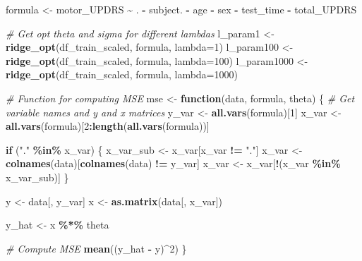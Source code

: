 \documentclass[
]{article}
\newenvironment{Shaded}{\begin{snugshade}}{\end{snugshade}}
\newcommand{\AttributeTok}[1]{\textcolor[rgb]{0.13,0.29,0.53}{#1}}
\newcommand{\CommentTok}[1]{\textcolor[rgb]{0.56,0.35,0.01}{\textit{#1}}}
\newcommand{\ControlFlowTok}[1]{\textcolor[rgb]{0.13,0.29,0.53}{\textbf{#1}}}
\newcommand{\DecValTok}[1]{\textcolor[rgb]{0.00,0.00,0.81}{#1}}
\newcommand{\FunctionTok}[1]{\textcolor[rgb]{0.13,0.29,0.53}{\textbf{#1}}}
\newcommand{\NormalTok}[1]{#1}
\newcommand{\OtherTok}[1]{\textcolor[rgb]{0.56,0.35,0.01}{#1}}
\newcommand{\SpecialCharTok}[1]{\textcolor[rgb]{0.81,0.36,0.00}{\textbf{#1}}}
\newcommand{\StringTok}[1]{\textcolor[rgb]{0.31,0.60,0.02}{#1}}
\begin{document}
\begin{Shaded}
\begin{Highlighting}[]
\NormalTok{formula }\OtherTok{\textless{}{-}}\NormalTok{ motor\_UPDRS }\SpecialCharTok{\textasciitilde{}}\NormalTok{ . }\SpecialCharTok{{-}}\NormalTok{ subject. }\SpecialCharTok{{-}}\NormalTok{ age }\SpecialCharTok{{-}}\NormalTok{ sex }\SpecialCharTok{{-}}\NormalTok{ test\_time }\SpecialCharTok{{-}}\NormalTok{ total\_UPDRS}

\CommentTok{\# Get opt theta and sigma for different lambdas}
\NormalTok{l\_param1 }\OtherTok{\textless{}{-}} \FunctionTok{ridge\_opt}\NormalTok{(df\_train\_scaled, formula, }\AttributeTok{lambda=}\DecValTok{1}\NormalTok{)}
\NormalTok{l\_param100 }\OtherTok{\textless{}{-}} \FunctionTok{ridge\_opt}\NormalTok{(df\_train\_scaled, formula, }\AttributeTok{lambda=}\DecValTok{100}\NormalTok{)}
\NormalTok{l\_param1000 }\OtherTok{\textless{}{-}} \FunctionTok{ridge\_opt}\NormalTok{(df\_train\_scaled, formula, }\AttributeTok{lambda=}\DecValTok{1000}\NormalTok{)}

\CommentTok{\# Function for computing MSE}
\NormalTok{mse }\OtherTok{\textless{}{-}} \ControlFlowTok{function}\NormalTok{(data, formula, theta) \{}
  \CommentTok{\# Get variable names and y and x matrices}
\NormalTok{  y\_var }\OtherTok{\textless{}{-}} \FunctionTok{all.vars}\NormalTok{(formula)[}\DecValTok{1}\NormalTok{]}
\NormalTok{  x\_var }\OtherTok{\textless{}{-}} \FunctionTok{all.vars}\NormalTok{(formula)[}\DecValTok{2}\SpecialCharTok{:}\FunctionTok{length}\NormalTok{(}\FunctionTok{all.vars}\NormalTok{(formula))]}
  
  \ControlFlowTok{if}\NormalTok{ (}\StringTok{"."} \SpecialCharTok{\%in\%}\NormalTok{ x\_var) \{}
\NormalTok{    x\_var\_sub }\OtherTok{\textless{}{-}}\NormalTok{ x\_var[x\_var }\SpecialCharTok{!=} \StringTok{"."}\NormalTok{]}
\NormalTok{    x\_var }\OtherTok{\textless{}{-}} \FunctionTok{colnames}\NormalTok{(data)[}\FunctionTok{colnames}\NormalTok{(data) }\SpecialCharTok{!=}\NormalTok{ y\_var]}
\NormalTok{    x\_var }\OtherTok{\textless{}{-}}\NormalTok{ x\_var[}\SpecialCharTok{!}\NormalTok{(x\_var }\SpecialCharTok{\%in\%}\NormalTok{ x\_var\_sub)]}
\NormalTok{  \}}
  
\NormalTok{  y }\OtherTok{\textless{}{-}}\NormalTok{ data[, y\_var]}
\NormalTok{  x }\OtherTok{\textless{}{-}} \FunctionTok{as.matrix}\NormalTok{(data[, x\_var])}
  
\NormalTok{  y\_hat }\OtherTok{\textless{}{-}}\NormalTok{ x }\SpecialCharTok{\%*\%}\NormalTok{ theta}
  
  \CommentTok{\# Compute MSE}
  \FunctionTok{mean}\NormalTok{((y\_hat }\SpecialCharTok{{-}}\NormalTok{ y)}\SpecialCharTok{\^{}}\DecValTok{2}\NormalTok{)}
\NormalTok{\}}


\end{Highlighting}
\end{Shaded}
\end{document}
